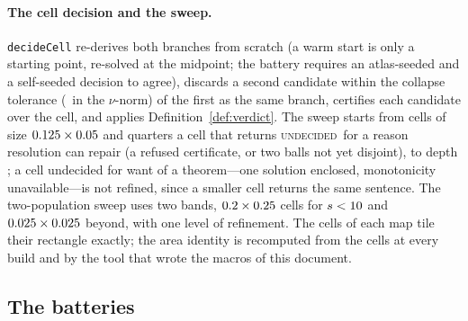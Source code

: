 \documentclass[11pt]{article}
\theoremstyle{definition}
\newcommand{\UNDEC}{\textup{\textsc{undecided}}}
\begin{document}
\paragraph{The cell decision and the sweep.} \texttt{decideCell} re-derives both branches from scratch (a warm start is only a starting point, re-solved at the midpoint; the battery requires an atlas-seeded and a self-seeded decision to agree), discards a second candidate within the collapse tolerance (\OneCollapseTol\ in the $\nu$-norm) of the first as the same branch, certifies each candidate over the cell, and applies Definition~\ref{def:verdict}. The sweep starts from cells of size $0.125\times0.05$ and quarters a cell that returns \UNDEC\ for a reason resolution can repair (a refused certificate, or two balls not yet disjoint), to depth \OneMaxDepth; a cell undecided for want of a theorem---one solution enclosed, monotonicity unavailable---is not refined, since a smaller cell returns the same sentence. The two-population sweep uses two bands, $0.2\times0.25$ cells for $s<10$ and $0.025\times0.025$ beyond, with one level of refinement. The cells of each map tile their rectangle exactly; the area identity is recomputed from the cells at every build and by the tool that wrote the macros of this document.

\subsection{The batteries}\label{sec:batteries}
\end{document}
